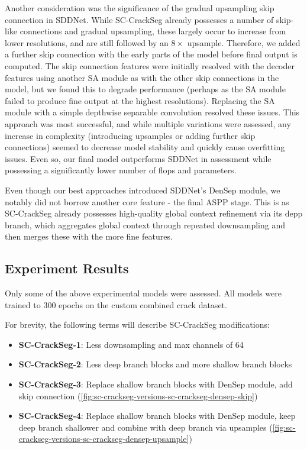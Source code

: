 \documentclass[a4paper,12pt]{report}
\begin{document}
Another consideration was the significance of the gradual upsampling skip connection in SDDNet. While SC-CrackSeg already possesses a number of skip-like connections and gradual upsampling, these largely occur to increase from lower resolutions, and are still followed by an $8 \times$ upsample. Therefore, we added a further skip connection with the early parts of the model before final output is computed. The skip connection features were initially resolved with the decoder features using another SA module as with the other skip connections in the model, but we found this to degrade performance (perhaps as the SA module failed to produce fine output at the highest resolutions). Replacing the SA module with a simple depthwise separable convolution resolved these issues. This approach was most successful, and while multiple variations were assessed, any increase in complexity (introducing upsamples or adding further skip connections) seemed to decrease model stability and quickly cause overfitting issues. Even so, our final model outperforms SDDNet in assessment while possessing a significantly lower number of flops and parameters.%



Even though our best approaches introduced SDDNet's DenSep module, we notably did not borrow another core feature - the final ASPP stage. This is as SC-CrackSeg already possesses high-quality global context refinement via its depp branch, which aggregates global context through repeated downsampling and then merges these with the more fine features.

\subsection{Experiment Results}

Only some of the above experimental models were assessed. All models were trained to 300 epochs on the custom combined crack dataset.

For brevity, the following terms will describe SC-CrackSeg modifications:
\begin{itemize}
    \item \textbf{SC-CrackSeg-1}: Less downsampling and max channels of 64
    \item \textbf{SC-CrackSeg-2}: Less deep branch blocks and more shallow branch blocks
    \item \textbf{SC-CrackSeg-3}: Replace shallow branch blocks with DenSep module, add skip connection (\autoref{fig:sc-crackseg-versions-sc-crackseg-densep-skip})
    \item \textbf{SC-CrackSeg-4}: Replace shallow branch blocks with DenSep module, keep deep branch shallower and combine with deep branch via upsamples (\autoref{fig:sc-crackseg-versions-sc-crackseg-densep-upsample})
\end{itemize}
\end{document}

